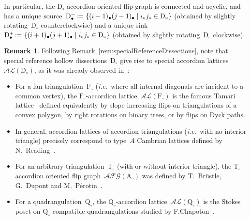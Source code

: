 \documentclass{amsart}
\theoremstyle{definition}
\newtheorem{remark}[theorem]{Remark}
\newcommand{\set}[2]{\left\{ #1 \;\middle|\; #2 \right\}} %
\newcommand{\eqdef}{\mbox{\,\raisebox{0.2ex}{\scriptsize\ensuremath{\mathrm:}}\ensuremath{=}\,}} %
\newcommand{\ie}{\textit{i.e.}~} %
\newcommand{\accordionLattice}{\mathcal{AL}} %
\newcommand{\accordionFlipGraph}{\mathcal{AFG}} %
\newcommand{\triangulation}{\mathrm{T}} %
\newcommand{\fanTriangulation}{\mathrm{F}} %
\newcommand{\quadrangulation}{\mathrm{Q}} %
\newcommand{\dissection}{\mathrm{D}} %
\newcommand{\accordion}{\mathrm{A}} %
\newcommand{\mi}{-} %
\newcommand{\ma}{+} %
\begin{document}
In particular, the $\dissection_\circ$-accordion oriented flip graph is connected and acyclic, and has a unique source~$\dissection_\bullet^\mi \eqdef \set{(i-1)_\bullet (j-1)_\bullet}{i_\circ j_\circ \in \dissection_\circ}$ (obtained by slightly rotating~$\dissection_\circ$ counterclockwise) and a unique sink~$\dissection_\bullet^\ma \eqdef \set{(i+1)_\bullet (j+1)_\bullet}{i_\circ j_\circ \in \dissection_\circ}$ (obtained by slightly rotating~$\dissection_\circ$ clockwise).

\begin{remark}
Following Remark~\ref{rem:specialReferenceDissections}, note that special reference hollow dissections~$\dissection_\circ$ give rise to special accordion lattices~$\accordionLattice(\dissection_\circ)$, as it was already observed in~\cite{GarverMcConville}:
\begin{itemize}
\item For a fan triangulation~$\fanTriangulation_\circ$ (\ie where all internal diagonals are incident to a common vertex), the $\fanTriangulation_\circ$-accordion lattice~$\accordionLattice(\fanTriangulation_\circ)$ is the famous Tamari lattice~\cite{Tamari, TamariFestschrift} defined equivalently by slope increasing flips on triangulations of a convex polygon, by right rotations on binary trees, or by flips on Dyck paths.
\item In general, accordion lattices of accordion triangulations (\ie with no interior triangle) precisely correspond to type~$A$ Cambrian lattices defined by N.~Reading~\cite{Reading-CambrianLattices}.
\item For an arbitrary triangulation~$\triangulation_\circ$ (with or without interior triangle), the $\triangulation_\circ$-accordion oriented flip graph~$\accordionFlipGraph(\accordion_\circ)$ was defined by T.~Br\"ustle, G.~Dupont and M.~P\'erotin~\cite{BrustleDupontPerotin}.
\item For a quadrangulation~$\quadrangulation_\circ$, the $\quadrangulation_\circ$-accordion lattice~$\accordionLattice(\quadrangulation_\circ)$ is the Stokes poset on \mbox{$\quadrangulation_\circ$-com}\-patible quadrangulations studied by F.Chapoton~\cite{Chapoton-quadrangulations}.
\end{itemize}
\end{remark}
\end{document}
